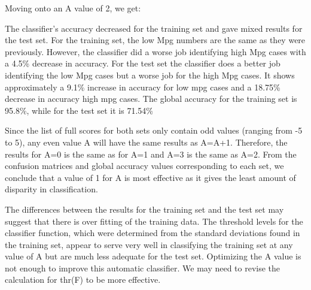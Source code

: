 \documentclass{homework}
\begin{document}
Moving onto an A value of 2, we get:
\begin{table}[H]
    \centering
    \caption{Confusion Matrix. True class is by row, Predicted class is by column}
    \label{tab:my_label}
\end{table}
The classifier's accuracy decreased for the training set and gave mixed results for the test set. For the training set, the low Mpg numbers are the same as they were previously. However, the classifier did a worse job identifying high Mpg cases with a 4.5\% decrease in accuracy. For the test set the classifier does a better job identifying the low Mpg cases but a worse job for the high Mpg cases. It shows approximately a 9.1\% increase in accuracy for low mpg cases and a 18.75\%  decrease in accuracy high mpg cases. The global accuracy for the training set is 95.8\%, while for the test set it is 71.54\%

Since the list of full scores for both sets only contain odd values (ranging from -5 to 5), any even value A will have the same results as A=A+1. Therefore, the results for A=0 is the same as for A=1 and A=3 is the same as A=2. From the confusion matrices and global accuracy values corresponding to each set, we conclude that a value of 1 for A is most effective as it gives the least amount of disparity in classification.

The differences between the results for the training set and the test set may suggest that there is over fitting of the training data. The threshold levels for the classifier function, which were determined from the standard deviations found in the training set, appear to serve very well in classifying the training set at any value of A but are much less adequate for the test set. Optimizing the A value is not enough to improve this automatic classifier. We may need to revise the calculation for thr(F) to be more effective. 

\newpage

\end{document}
